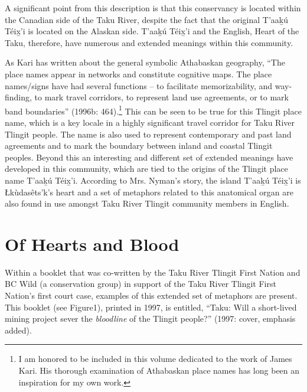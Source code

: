 A significant point from this description is that this conservancy is located within the Canadian side of the Taku River, despite the fact that the original T'aak̲ú Téix̲'i is located on the Alaskan side. T'aak̲ú Téix̲'i and the English, Heart of the Taku, therefore, have numerous and extended meanings within this community.

As Kari has written about the general symbolic Athabaskan geography, “The place names appear in networks and constitute cognitive maps. The place names/signs have had several functions – to facilitate memorizability, and way-finding, to mark travel corridors, to represent land use agreements, or to mark band boundaries” (1996b: 464).\footnote{ I am honored to be included in this volume dedicated to the work of James Kari. His thorough examination of Athabaskan place names has long been an inspiration for my own work. } This can be seen to be true for this Tlingit place name, which is a key locale in a highly significant travel corridor for Taku River Tlingit people. The name is also used to represent contemporary and past land agreements and to mark the boundary between inland and coastal Tlingit peoples. Beyond this an interesting and different set of extended meanings have developed in this community, which are tied to the origins of the Tlingit place name T'aak̲ú Téix̲'i. According to Mrs. Nyman’s story, the island T'aak̲ú Téix̲'i is Łkùdasêts’k’s heart and a set of metaphors related to this anatomical organ are also found in use amongst Taku River Tlingit community members in English.

\section{Of Hearts and Blood}

Within a booklet that was co-written by the Taku River Tlingit First Nation and BC Wild (a conservation group) in support of the Taku River Tlingit First Nation’s first court case, examples of this extended set of metaphors are present. This booklet (see Figure1), printed in 1997, is entitled, “Taku: Will a short-lived mining project sever the \textit{bloodline }of the Tlingit people?” (1997: cover, emphasis added).

